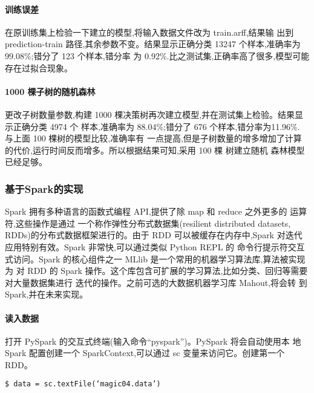 \paragraph{训练误差}\label{ux8badux7ec3ux8befux5dee}

在原训练集上检验一下建立的模型,将输入数据文件改为 train.arff,结果输 出到
prediction-train 路径,其余参数不变。结果显示正确分类 13247
个样本,准确率为 99.08\%;错分了 123 个样本,错分率 为
0.92\%.比之测试集,正确率高了很多,模型可能存在过拟合现象。

\paragraph{1000
棵子树的随机森林}\label{ux68f5ux5b50ux6811ux7684ux968fux673aux68eeux6797}

更改子树数量参数,构建 1000
棵决策树再次建立模型,并在测试集上检验。结果显示正确分类 4974 个
样本,准确率为 88.04\%;错分了 676 个样本,错分率为11.96\%. 与上面 100
棵树的模型比较,准确率有
一点提高,但是子树数量的增多增加了计算的代价,运行时间反而增多。所以根据结果可知,采用
100 棵 树建立随机 森林模型已经足够。

\subsubsection{基于Spark的实现}\label{ux57faux4e8esparkux7684ux5b9eux73b0}

Spark 拥有多种语言的函数式编程 API,提供了除 map 和 reduce 之外更多的
运算符,这些操作是通过 一个称作弹性分布式数据集(resilient distributed
datasets, RDDs)的分布式数据框架进行的。由于 RDD 可以被缓存在内存中,Spark
对迭代 应用特别有效。Spark 非常快,可以通过类似 Python REPL 的
命令行提示符交互 式访问。Spark 的核心组件之一 MLlib
是一个常用的机器学习算法库,算法被实现 为 对 RDD 的 Spark
操作。这个库包含可扩展的学习算法,比如分类、回归等需要 对大量数据集进行
迭代的操作。之前可选的大数据机器学习库 Mahout,将会转 到
Spark,并在未来实现。

\paragraph{读入数据}\label{ux8bfbux5165ux6570ux636e}

打开 PySpark 的交互式终端(输入命令``pyspark'')。PySpark 将会自动使用本
地 Spark 配置创建一个 SparkContext,可以通过 sc 变量来访问它。创建第一个
RDD。

\begin{lstlisting}
$ data = sc.textFile(‘magic04.data’)
\end{lstlisting}

